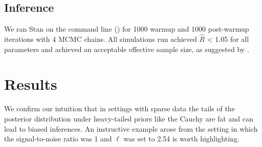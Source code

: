 \documentclass{article}
\begin{document}
\subsection{Inference}

We ran Stan on the command line (\citet{cmdstan}) for 1000 warmup and 1000
post-warmup iterations with 4 MCMC chains. All simulations run achieved
$\hat{R}$ < 1.05 for all parameters and achieved an acceptable effective sample
size, as suggested by \citet{gelman2014bayesian}.

\section{Results} \label{results}

We confirm our intuition that in settings with sparse data the tails of the
posterior distribution under heavy-tailed priors like the Cauchy are fat and
can lead to biased inferences. An instructive example arose from the setting in
which the signal-to-noise ratio was 1 and $\ell$ was set to 2.54 is worth
highlighting.
\end{document}
